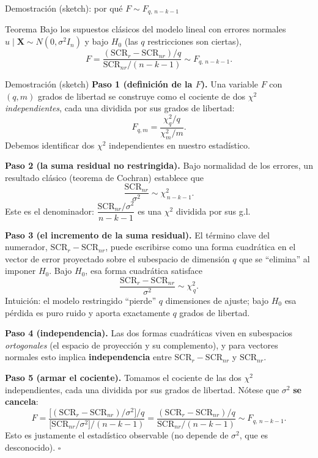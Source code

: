 \documentclass{beamer}
\begin{document}
\begin{frame}[allowframebreaks]{Demostración (sketch): por qué $F \sim F_{q,\,n-k-1}$}

\begin{alertblock}{Teorema}
Bajo los supuestos clásicos del modelo lineal con errores normales $u\mid \mathbf{X}\sim N(0,\sigma^2 I_n)$ y bajo $H_0$ (las $q$ restricciones son ciertas),
\[
   F = \frac{(\text{SCR}_r - \text{SCR}_{nr})/q}{\text{SCR}_{nr}/(n-k-1)} \sim F_{q,\,n-k-1}.
\]
\end{alertblock}

\begin{exampleblock}{Demostración (sketch)}
\textbf{Paso 1 (definición de la $F$).} Una variable $F$ con $(q, m)$ grados de libertad se construye como el cociente de dos $\chi^2$ \emph{independientes}, cada una dividida por sus grados de libertad:
\[
   F_{q,m} = \frac{\chi^2_q / q}{\chi^2_m / m}.
\]
Debemos identificar dos $\chi^2$ independientes en nuestro estadístico.

\framebreak

\textbf{Paso 2 (la suma residual no restringida).} Bajo normalidad de los errores, un resultado clásico (teorema de Cochran) establece que
\[
   \frac{\text{SCR}_{nr}}{\sigma^2} \sim \chi^2_{\,n-k-1}.
\]
Este es el denominador: $\dfrac{\text{SCR}_{nr}/\sigma^2}{n-k-1}$ es una $\chi^2$ dividida por sus g.l.

\framebreak

\textbf{Paso 3 (el incremento de la suma residual).} El término clave del numerador, $\text{SCR}_r - \text{SCR}_{nr}$, puede escribirse como una forma cuadrática en el vector de error proyectado sobre el subespacio de dimensión $q$ que se ``elimina'' al imponer $H_0$. Bajo $H_0$, esa forma cuadrática satisface
\[
   \frac{\text{SCR}_r - \text{SCR}_{nr}}{\sigma^2} \sim \chi^2_{\,q}.
\]
Intuición: el modelo restringido ``pierde'' $q$ dimensiones de ajuste; bajo $H_0$ esa pérdida es puro ruido y aporta exactamente $q$ grados de libertad.

\framebreak

\textbf{Paso 4 (independencia).} Las dos formas cuadráticas viven en subespacios \emph{ortogonales} (el espacio de proyección y su complemento), y para vectores normales esto implica \textbf{independencia} entre $\text{SCR}_r-\text{SCR}_{nr}$ y $\text{SCR}_{nr}$.

\framebreak

\textbf{Paso 5 (armar el cociente).} Tomamos el cociente de las dos $\chi^2$ independientes, cada una dividida por sus grados de libertad. Nótese que $\sigma^2$ \textbf{se cancela}:
\[
   F = \frac{\big[(\text{SCR}_r - \text{SCR}_{nr})/\sigma^2\big]/q}{\big[\text{SCR}_{nr}/\sigma^2\big]/(n-k-1)}
     = \frac{(\text{SCR}_r - \text{SCR}_{nr})/q}{\text{SCR}_{nr}/(n-k-1)} \sim F_{q,\,n-k-1}.
\]
Esto es justamente el estadístico observable (no depende de $\sigma^2$, que es desconocido). \hfill $\square$
\end{exampleblock}
\end{frame}
\end{document}
